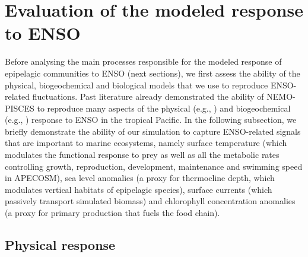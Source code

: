 
\section{Evaluation of the modeled response to ENSO}
\label{sec:model-val}

Before analysing the main processes responsible for the modeled response of epipelagic communities to ENSO (next sections), we first assess the ability of the physical, biogeochemical and biological models that we use to reproduce ENSO-related fluctuations. Past literature already demonstrated the ability of NEMO-PISCES to reproduce many aspects of the physical (e.g., \citealt{vialardModelStudyOceanic2001, lengaigneMechanismsControllingWarm2012, drushkaProcessesDrivingIntraseasonal2015, puyModulationEquatorialPacific2019}) and biogeochemical (e.g., \citealt{ masottiLargescaleShiftsPhytoplankton2011,gorguesRevisitingNina19982010, martinezReconstructingGlobalChlorophylla2020}) response to ENSO in the tropical Pacific. In the following subsection, we briefly demonstrate the ability of our simulation to capture ENSO-related signals that are important to marine ecosystems, namely surface temperature (which modulates the functional response to prey as well as all the metabolic rates controlling growth, reproduction, development, maintenance and swimming speed in APECOSM), sea level anomalies (a proxy for thermocline depth, which modulates vertical habitats of epipelagic species), surface currents (which passively transport simulated biomass) and chlorophyll concentration anomalies (a proxy for primary production that fuels the food chain).

\subsection{Physical response}

